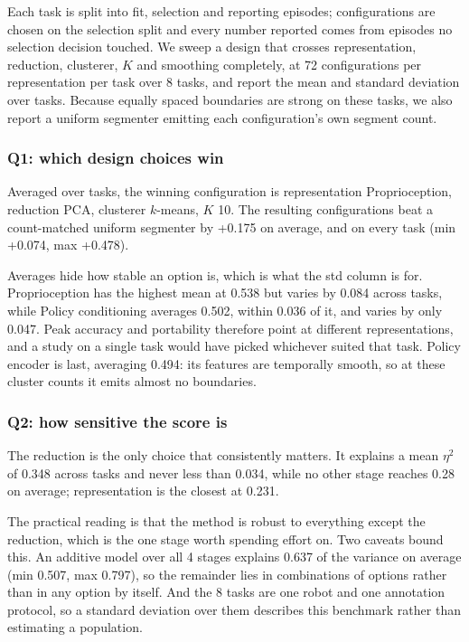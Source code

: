 
Each task is split into fit, selection and reporting episodes; configurations are chosen on the selection split and every number reported comes from episodes no selection decision touched. We sweep a design that crosses representation, reduction, clusterer, $K$ and smoothing completely, at 72 configurations per representation per task over 8 tasks, and report the mean and standard deviation over tasks. Because equally spaced boundaries are strong on these tasks, we also report a uniform segmenter emitting each configuration's own segment count.

\subsubsection{Q1: which design choices win}

Averaged over tasks, the winning configuration is representation Proprioception, reduction PCA, clusterer $k$-means, $K$ 10. The resulting configurations beat a count-matched uniform segmenter by +0.175 on average, and on every task (min +0.074, max +0.478).

Averages hide how stable an option is, which is what the std column is for. Proprioception has the highest mean at 0.538 but varies by 0.084 across tasks, while Policy conditioning averages 0.502, within 0.036 of it, and varies by only 0.047. Peak accuracy and portability therefore point at different representations, and a study on a single task would have picked whichever suited that task. Policy encoder is last, averaging 0.494: its features are temporally smooth, so at these cluster counts it emits almost no boundaries.

\subsubsection{Q2: how sensitive the score is}

The reduction is the only choice that consistently matters. It explains a mean $\eta^2$ of 0.348 across tasks and never less than 0.034, while no other stage reaches 0.28 on average; representation is the closest at 0.231.

The practical reading is that the method is robust to everything except the reduction, which is the one stage worth spending effort on. Two caveats bound this. An additive model over all 4 stages explains 0.637 of the variance on average (min 0.507, max 0.797), so the remainder lies in combinations of options rather than in any option by itself. And the 8 tasks are one robot and one annotation protocol, so a standard deviation over them describes this benchmark rather than estimating a population.

